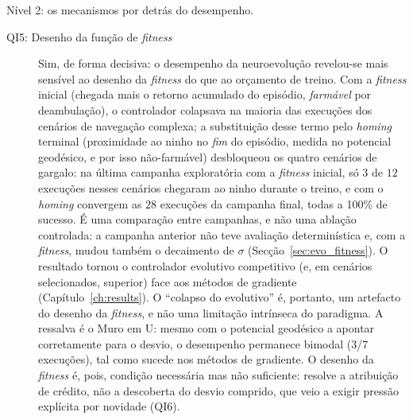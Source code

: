 \documentclass[12pt,reqno, twoside]{amsbook}
\makeatletter
\def\paragraph{\@startsection{paragraph}{4}%
  \z@\z@{-\fontdimen2\font}%
  {\normalfont\bfseries}}
\theoremstyle{plain}
\numberwithin{equation}{chapter}
\numberwithin{section}{chapter}
\numberwithin{table}{chapter}
\numberwithin{figure}{chapter}
\makeatother
\begin{document}
\paragraph{Nível 2: os mecanismos por detrás do desempenho.}
\begin{description}
    \item[QI5: Desenho da função de \textit{fitness}] Sim, de forma decisiva: o desempenho da neuroevolução revelou-se mais sensível ao desenho da \textit{fitness} do que ao orçamento de treino. Com a \textit{fitness} inicial (chegada mais o retorno acumulado do episódio, \emph{farmável} por deambulação), o controlador colapsava na maioria das execuções dos cenários de navegação complexa; a substituição desse termo pelo \textit{homing} terminal (proximidade ao ninho no \emph{fim} do episódio, medida no potencial geodésico, e por isso não-farmável) desbloqueou os quatro cenários de gargalo: na última campanha exploratória com a \textit{fitness} inicial, só $3$ de $12$ execuções nesses cenários chegaram ao ninho durante o treino, e com o \textit{homing} convergem as $28$ execuções da campanha final, todas a 100\% de sucesso. É uma comparação entre campanhas, e não uma ablação controlada: a campanha anterior não teve avaliação determinística e, com a \textit{fitness}, mudou também o decaimento de $\sigma$ (Secção~\ref{sec:evo_fitness}). O resultado tornou o controlador evolutivo competitivo (e, em cenários selecionados, superior) face aos métodos de gradiente (Capítulo~\ref{ch:results}). O ``colapso do evolutivo'' é, portanto, um artefacto do desenho da \textit{fitness}, e não uma limitação intrínseca do paradigma. A ressalva é o Muro em U: mesmo com o potencial geodésico a apontar corretamente para o desvio, o desempenho permanece bimodal (3/7 execuções), tal como sucede nos métodos de gradiente. O desenho da \textit{fitness} é, pois, condição necessária mas não suficiente: resolve a atribuição de crédito, não a descoberta do desvio comprido, que veio a exigir pressão explícita por novidade (QI6).

\end{description}
\end{document}
